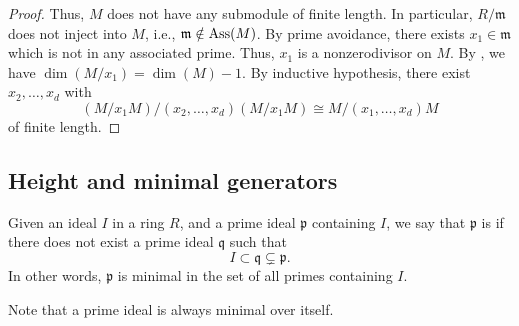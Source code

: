 \documentclass[12pt]{article}
\begin{document}
\begin{proof}
	Thus, $M$ does not have any submodule of finite length. In particular, $R/\mathfrak{m}$ does not inject into $M$, i.e., $\mathfrak{m} \notin \operatorname{Ass}(M)$. By prime avoidance, there exists $x_{1} \in \mathfrak{m}$ which is not in any associated prime. Thus, $x_{1}$ is a nonzerodivisor on $M$. By , we have $\dim(M/x_{1}) = \dim(M) - 1$. \newline
	By inductive hypothesis, there exist $x_{2}, \ldots, x_{d}$ with
	\begin{equation*} 
		(M/x_{1} M)/(x_{2}, \ldots, x_{d})(M/x_{1} M) \cong M/(x_{1}, \ldots, x_{d})M
	\end{equation*}
	of finite length. 
\end{proof}

\subsection{Height and minimal generators}

\begin{defn}
	Given an ideal $I$ in a ring $R$, and a prime ideal $\mathfrak{p}$ containing $I$, we say that $\mathfrak{p}$ is  if there does not exist a prime ideal $\mathfrak{q}$ such that
	\begin{equation*} 
		I \subset \mathfrak{q} \subsetneq \mathfrak{p}.
	\end{equation*}
	In other words, $\mathfrak{p}$ is minimal in the set of all primes containing $I$.
\end{defn}
Note that a prime ideal is always minimal over itself.
\end{document}
